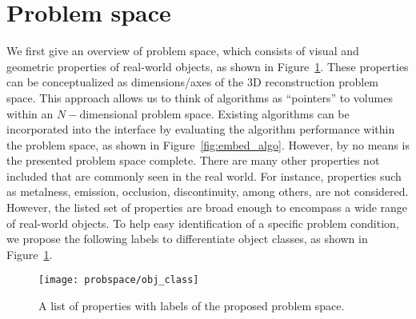 \section{Problem space}
\label{sec:prob_space}
We first give an overview of problem space, which consists of visual and geometric properties of real-world objects, as shown in Figure~\ref{fig:obj_class}. These properties can be conceptualized as dimensions/axes of the 3D reconstruction problem space. This approach allows us to think of algorithms as ``pointers'' to volumes within an $N-$dimensional problem space. Existing algorithms can be incorporated into the interface by evaluating the algorithm performance within the problem space, as shown in Figure~\ref{fig:embed_algo}. However, by no means is the presented problem space complete. There are many other properties not included that are commonly seen in the real world. For instance, properties such as metalness, emission, occlusion, discontinuity, among others, are not considered. However, the listed set of properties are broad enough to encompass a wide range of real-world objects. To help easy identification of a specific problem condition, we propose the following labels to differentiate object classes, as shown in Figure~\ref{fig:obj_class}.
\begin{figure}[!htbp]
\centering
\texttt{[image: probspace/obj\_class]}\\
\caption{A list of properties with labels of the proposed problem space.}
\label{fig:obj_class}
\end{figure}

